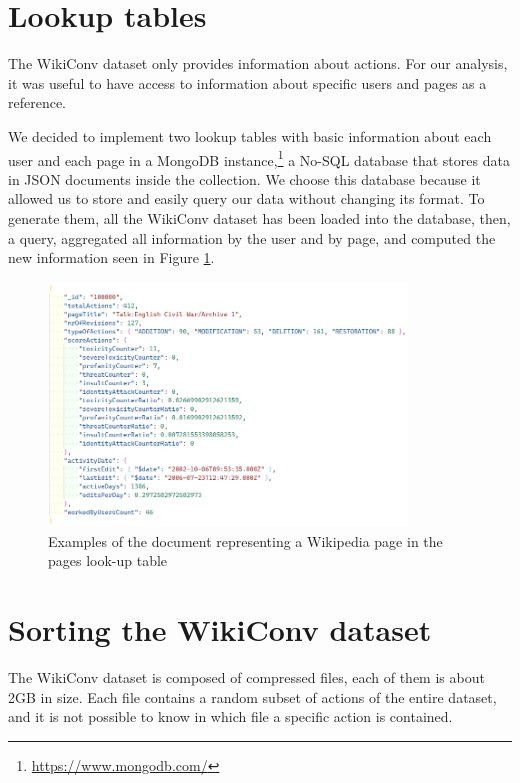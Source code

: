 \section{Lookup tables}
\label{sec:lookuptable}
The WikiConv dataset only provides information about actions. For our analysis, it was useful to have access to information about specific users and pages as a reference.

We decided to implement two lookup tables with basic information about each user and each page in a MongoDB instance,\footnote{\url{https://www.mongodb.com/}} a No-SQL database that stores data in JSON documents inside the collection. We choose this database because it allowed us to store and easily query our data without changing its format. To generate them, all the WikiConv dataset has been loaded into the database, then, a query, aggregated all information by the user and by page, and computed the new information seen in Figure \ref{fig:mongo}.

\begin{figure}[H]
    \centering
    \includegraphics[width=0.85\textwidth]{./img/mongo.png}
    \caption{Examples of the document representing a Wikipedia page in the pages look-up table}
    \label{fig:mongo}
\end{figure}

\section{Sorting the WikiConv dataset}
\label{sec:sortingthewikiconvdataset}
The WikiConv dataset is composed of compressed files, each of them is about 2GB in size. Each file contains a random subset of actions of the entire dataset, and it is not possible to know in which file a specific action is contained.

